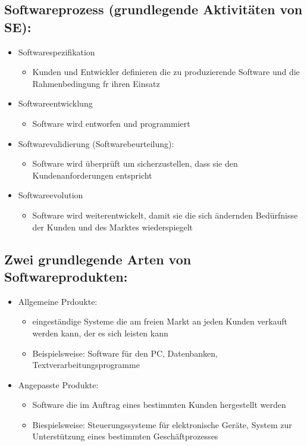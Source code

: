 \subsection{Softwareprozess (grundlegende Aktivitäten von SE):}
\begin{itemize}
    \item Softwarespezifikation
    \begin{itemize}
        \item Kunden und Entwickler definieren die zu produzierende Software und die Rahmenbedingung fr ihren Einsatz
    \end{itemize}
    \item Softwareentwicklung
    \begin{itemize}
        \item Software wird entworfen und programmiert
    \end{itemize}
    \item Softwarevalidierung (Softwarebeurteilung):
    \begin{itemize}
        \item Software wird überprüft um sicherzustellen, dass sie den Kundenanforderungen entspricht
    \end{itemize}
    \item Softwareevolution
    \begin{itemize}
        \item Software wird weiterentwickelt, damit sie die sich ändernden Bedürfnisse der Kunden und des Marktes wiederspiegelt
    \end{itemize}
\end{itemize}

\subsection{Zwei grundlegende Arten von Softwareprodukten:}
\begin{itemize}
    \item Allgemeine Prdoukte:
    \begin{itemize}
        \item eingeständige Systeme die am freien Markt an jeden Kunden verkauft werden kann, der es sich leisten kann
        \item Beispielsweise: Software für den PC, Datenbanken, Textverarbeitungsprogramme
    \end{itemize}
    \item Angepasste Produkte:
    \begin{itemize}
        \item Software die im Auftrag eines bestimmten Kunden hergestellt werden
        \item Biespielsweise: Steuerungssysteme für elektronische Geräte, System zur Unterstützung eines bestimmten Geschäftprozesses
    \end{itemize}
\end{itemize}

